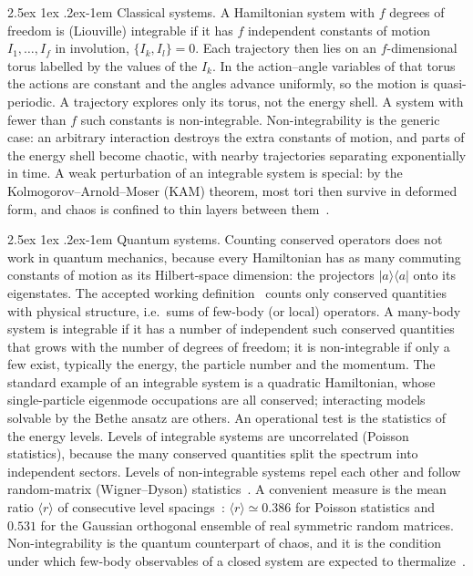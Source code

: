 \documentclass[10pt,a4paper]{article}
\makeatletter
\renewcommand{\paragraph}{\@startsection{paragraph}{4}{\z@}%
  {2.5ex \@plus 1ex \@minus .2ex}{-1em}%
  {\normalfont\fontsize{14pt}{17pt}\selectfont\bfseries}}
\makeatother
\begin{document}
\paragraph{Classical systems.}
A Hamiltonian system with $ f $ degrees of freedom is (Liouville) integrable if it has $ f $ independent constants of motion $ I_1, \dots, I_f $ in involution, $ \{ I_k , I_l \} = 0 $.
Each trajectory then lies on an $ f $-dimensional torus labelled by the values of the $ I_k $. In the action--angle variables of that torus the actions are constant and the angles advance uniformly, so the motion is quasi-periodic.
A trajectory explores only its torus, not the energy shell.
A system with fewer than $ f $ such constants is non-integrable.
Non-integrability is the generic case: an arbitrary interaction destroys the extra constants of motion, and parts of the energy shell become chaotic, with nearby trajectories separating exponentially in time.
A weak perturbation of an integrable system is special: by the Kolmogorov--Arnold--Moser (KAM) theorem, most tori then survive in deformed form, and chaos is confined to thin layers between them~\cite{Berman2005}.

\paragraph{Quantum systems.}
Counting conserved operators does not work in quantum mechanics, because every Hamiltonian has as many commuting constants of motion as its Hilbert-space dimension: the projectors $ |a\rangle\langle a| $ onto its eigenstates.
The accepted working definition~\cite{Caux2011} counts only conserved quantities with physical structure, i.e.\ sums of few-body (or local) operators.
A many-body system is integrable if it has a number of independent such conserved quantities that grows with the number of degrees of freedom; it is non-integrable if only a few exist, typically the energy, the particle number and the momentum.
The standard example of an integrable system is a quadratic Hamiltonian, whose single-particle eigenmode occupations are all conserved; interacting models solvable by the Bethe ansatz are others.
An operational test is the statistics of the energy levels.
Levels of integrable systems are uncorrelated (Poisson statistics), because the many conserved quantities split the spectrum into independent sectors.
Levels of non-integrable systems repel each other and follow random-matrix (Wigner--Dyson) statistics~\cite{BerryTabor1977,Bohigas1984}.
A convenient measure is the mean ratio $ \langle r \rangle $ of consecutive level spacings~\cite{Oganesyan2007,Atas2013}: $ \langle r\rangle \simeq 0.386 $ for Poisson statistics and $ 0.531 $ for the Gaussian orthogonal ensemble of real symmetric random matrices.
Non-integrability is the quantum counterpart of chaos, and it is the condition under which few-body observables of a closed system are expected to thermalize~\cite{DAlessio2016}.
\end{document}
